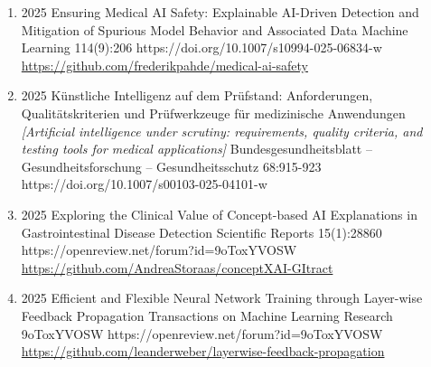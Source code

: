 {\begin{enumerate}
    \item {}
                        {2025}
                        {Ensuring Medical AI Safety: Explainable AI-Driven Detection and Mitigation of Spurious Model Behavior and Associated Data}
                        {Machine Learning}
                        {114(9):206}
                        {https://doi.org/10.1007/s10994-025-06834-w}
                        {
                            \\\href{https://github.com/frederikpahde/medical-ai-safety}{https://github.com/frederikpahde/medical-ai-safety}
                        }
                      
                      
    \item {}
                        {2025}
                        {Künstliche Intelligenz auf dem Prüfstand: Anforderungen, Qualitätskriterien und Prüfwerkzeuge für medizinische Anwendungen \textit{[Artificial intelligence under scrutiny: requirements, quality criteria, and testing tools for medical applications]}}
                        {Bundesgesundheitsblatt -- Gesundheitsforschung -- Gesundheitsschutz}
                        {68:915-923}
                        {https://doi.org/10.1007/s00103-025-04101-w}

    
    \item {}
                        {2025}
                        {Exploring the Clinical Value of Concept-based AI Explanations in Gastrointestinal Disease Detection}
                        {Scientific Reports}
                        {15(1):28860}
                        {https://openreview.net/forum?id=9oToxYVOSW}
                        {\\ \href{https://github.com/AndreaStoraas/conceptXAI-GItract}{https://github.com/AndreaStoraas/conceptXAI-GItract}
                        }
                    
                        
    \item {}
                        {2025}
                        {Efficient and Flexible Neural Network Training through Layer-wise Feedback Propagation}
                        {Transactions on Machine Learning Research}
                        {9oToxYVOSW}
                        {https://openreview.net/forum?id=9oToxYVOSW}
                        {\\ \href{https://github.com/leanderweber/layerwise-feedback-propagation}{https://github.com/leanderweber/layerwise-feedback-propagation}
                        }


\end{enumerate}}
